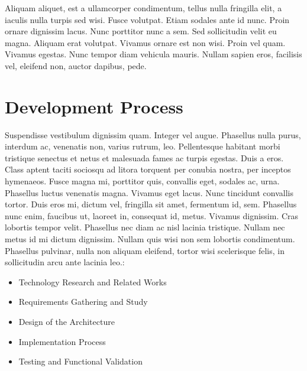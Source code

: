 \cleardoublepage
\label{chap:implement}

Aliquam aliquet, est a ullamcorper condimentum, tellus nulla fringilla elit, a iaculis nulla turpis sed wisi. Fusce volutpat. Etiam sodales ante id nunc. Proin ornare dignissim lacus. Nunc porttitor nunc a sem. Sed sollicitudin velit eu magna. Aliquam erat volutpat. Vivamus ornare est non wisi. Proin vel quam. Vivamus egestas. Nunc tempor diam vehicula mauris. Nullam sapien eros, facilisis vel, eleifend non, auctor dapibus, pede. 
\section{Development Process}
Suspendisse vestibulum dignissim quam. Integer vel augue. Phasellus nulla purus, interdum ac, venenatis non, varius rutrum, leo. Pellentesque habitant morbi tristique senectus et netus et malesuada fames ac turpis egestas. Duis a eros. Class aptent taciti sociosqu ad litora torquent per conubia nostra, per inceptos hymenaeos. Fusce magna mi, porttitor quis, convallis eget, sodales ac, urna. Phasellus luctus venenatis magna. Vivamus eget lacus. Nunc tincidunt convallis tortor. Duis eros mi, dictum vel, fringilla sit amet, fermentum id, sem. Phasellus nunc enim, faucibus ut, laoreet in, consequat id, metus. Vivamus dignissim. Cras lobortis tempor velit. Phasellus nec diam ac nisl lacinia tristique. Nullam nec metus id mi dictum dignissim. Nullam quis wisi non sem lobortis condimentum. Phasellus pulvinar, nulla non aliquam eleifend, tortor wisi scelerisque felis, in sollicitudin arcu ante lacinia leo.:

\begin{itemize}
\item{Technology Research and Related Works}
\item{Requirements Gathering and Study}
\item{Design of the Architecture}
\item{Implementation Process}
\item{Testing and Functional Validation}
\end{itemize}

